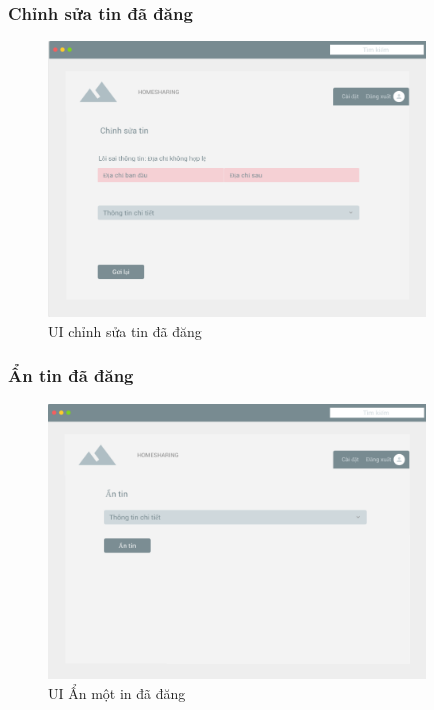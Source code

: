 \subsubsection{Chỉnh sửa tin đã đăng}
\begin{figure}[H]
	\centering
	\includegraphics[width=10cm]{parts/bao/images/resendPost.png}
	\vspace{0.5cm} 
	\caption{UI chỉnh sửa tin đã đăng}
\end{figure}

\subsubsection{Ẩn tin đã đăng}
\begin{figure}[H]
	\centering
	\includegraphics[width=10cm]{parts/bao/images/hidePost.png}
	\vspace{0.5cm} 
	\caption{UI Ẩn một in đã đăng}
\end{figure}%